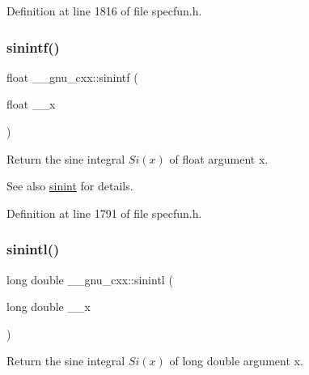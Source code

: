 Definition at line 1816 of file specfun.\+h.

\mbox{\label{group__mathsf__gnu_ga8b63406fec50d7e00470521b82fb32a2}} 
\subsubsection{\texorpdfstring{sinintf()}{sinintf()}}
{\footnotesize\ttfamily float \+\_\+\+\_\+gnu\+\_\+cxx\+::sinintf (\begin{DoxyParamCaption}\item[{float}]{\+\_\+\+\_\+x }\end{DoxyParamCaption})\hspace{0.3cm}{\ttfamily [inline]}}

Return the sine integral $ Si(x) $ of {\ttfamily float} argument {\ttfamily x}.

\begin{DoxySeeAlso}{See also}
\hyperlink{group__mathsf__gnu_ga076c8d52588904f5711c41781f8acfa0}{sinint} for details. 
\end{DoxySeeAlso}


Definition at line 1791 of file specfun.\+h.

\mbox{\label{group__mathsf__gnu_ga3ff83e5c5f1435064b6942ca8b7c8779}} 
\subsubsection{\texorpdfstring{sinintl()}{sinintl()}}
{\footnotesize\ttfamily long double \+\_\+\+\_\+gnu\+\_\+cxx\+::sinintl (\begin{DoxyParamCaption}\item[{long double}]{\+\_\+\+\_\+x }\end{DoxyParamCaption})\hspace{0.3cm}{\ttfamily [inline]}}

Return the sine integral $ Si(x) $ of {\ttfamily long double} argument {\ttfamily x}.

